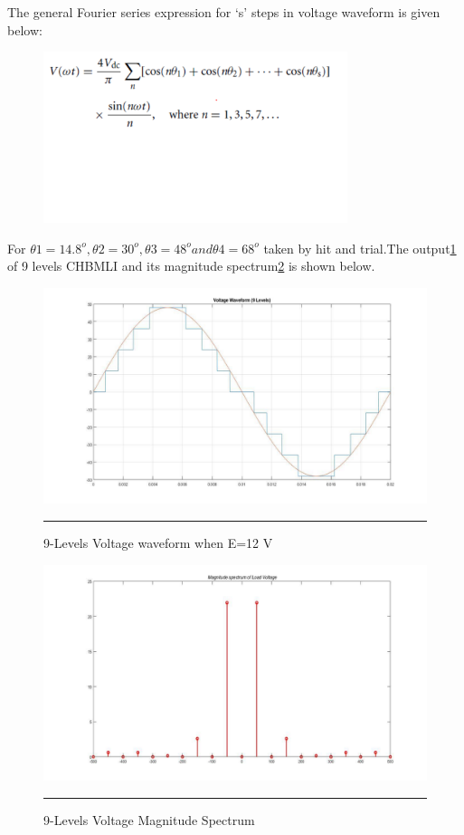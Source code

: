 The general Fourier series expression for ‘s’ steps in voltage waveform is given below:
\begin{figure}[htbp]
	\centering
		\includegraphics[width = 3.5in]{./Figures/eq.pdf}
				\end{figure}
				\begin{figure}[htbp]
\end{figure}
For $\theta1= 14.8^o, \theta2 = 30^o, \theta3 = 48^o and \theta4 = 68^o $ taken by hit and trial.The output\ref{fig:4} of 9 levels CHBMLI and its magnitude spectrum\ref{fig:5} is shown below. 
\begin{figure}[htbp]
	\centering
		\includegraphics[width = 5in]{./Figures/Presentation5.pdf}
		\rule{35em}{5pt}
	\caption{9-Levels Voltage waveform when E=12 V}
	\label{fig:4}
\end{figure}
\begin{figure}[htbp]
	\centering
		\includegraphics[width = 5in]{./Figures/Spectrum.pdf}
		\rule{35em}{5pt}
	\caption{9-Levels Voltage Magnitude Spectrum}
	\label{fig:5}
\end{figure}
